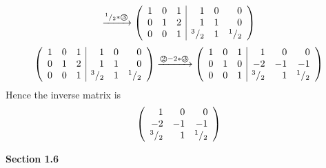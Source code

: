 \documentclass[8pt]{article} %
\begin{document}
\begin{enumerate}[1]
\begin{enumerate}[\bf(a)]
\[\xrightarrow{\text{${^{1}/_{2}}*$\textcircled{3}}}\left(\begin{array}{rrr|rrr}
1&0&1&1&0&0\\
0&1&2&1&1&0\\
0&0&1&{^{3}/_{2}}&1&{^{1}/_{2}}\\
\end{array}\right)
\]\[\left(\begin{array}{rrr|rrr}
1&0&1&1&0&0\\
0&1&2&1&1&0\\
0&0&1&{^{3}/_{2}}&1&{^{1}/_{2}}\\
\end{array}\right)
\xrightarrow{\text{\textcircled{2}$-2*$\textcircled{3}}}\left(\begin{array}{rrr|rrr}
1&0&1&1&0&0\\
0&1&0&-2&-1&-1\\
0&0&1&{^{3}/_{2}}&1&{^{1}/_{2}}\\
\end{array}\right)
\]
Hence the inverse matrix is
\[\left(\begin{array}{rrr}
1&0&0\\
-2&-1&-1\\
{^{3}/_{2}}&1&{^{1}/_{2}}\\
\end{array}\right)
\]
	\end{enumerate}
\end{enumerate}
\textbf{Section 1.6}
\end{document}
